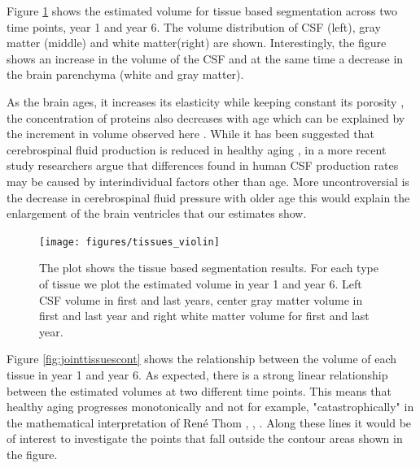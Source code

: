 \documentclass[11pt]{article}
\theoremstyle{definition}
\theoremstyle{remark}
\begin{document}
Figure \ref{fig:violtissues} shows the estimated volume for tissue based segmentation across two time points, year 1 and year 6. The volume distribution of CSF (left), gray matter (middle) and white matter(right) are shown. Interestingly, the figure shows an increase in the volume of the CSF and at the same time a decrease in the brain parenchyma (white and gray matter). 

As the brain ages, it increases its elasticity while keeping constant its porosity \cite{lasheras2007biomechanics}, the concentration of proteins also decreases with age which can be explained by the increment in volume observed here \cite{chen2012influence}. While it has been suggested that cerebrospinal fluid production is reduced in healthy aging \cite{may1990cerebrospinal}, in a more recent study \cite{gideon1994cerebrospinal} researchers argue that differences found in human CSF production rates may be caused by interindividual factors other than age. 
More uncontroversial is the decrease in cerebrospinal fluid pressure with older age \cite{fleischman2012cerebrospinal} this would explain the enlargement of the brain ventricles that our estimates show.

\begin{figure}[H]
        \centering
        \texttt{[image: figures/tissues\_violin]}
        \caption{The plot shows the tissue based segmentation results. For each type of tissue we plot the estimated volume in year 1 and year 6. Left CSF volume in first and last years, center gray matter volume in first and last year and right white matter volume for first and last year. } 
        \label{fig:violtissues}
\end{figure}

Figure \ref{fig:jointtissuescont} shows the relationship between the volume of each tissue in year 1 and year 6. As expected, there is a strong linear relationship between the estimated volumes at two different time points. This means that healthy aging progresses monotonically and not for example, "catastrophically" in the mathematical interpretation of René Thom \cite{rosen1979catastrophe}, \cite{zeeman1979catastrophe}, \cite{thom2018structural}. Along these lines it would be of interest to investigate the points that fall outside the contour areas shown in the figure.
\end{document}
